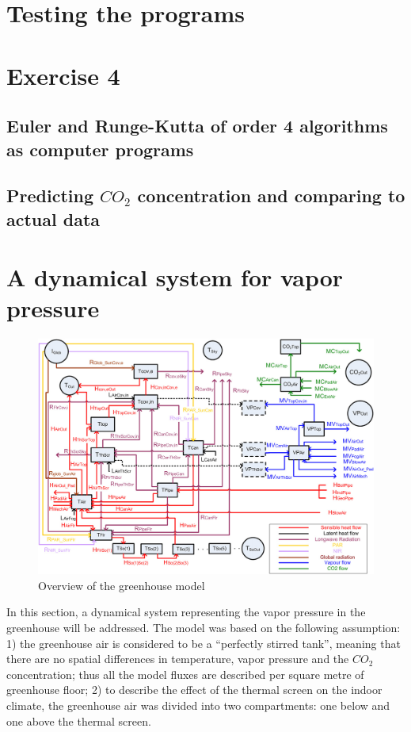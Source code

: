 \documentclass[a4paper]{article}
\begin{document}
\newpage
\section{Testing the programs}


\newpage
\section{Exercise 4}
\subsection{Euler and Runge-Kutta of order 4 algorithms as computer programs}

\subsection{Predicting \(CO_2\) concentration and comparing to actual data}


\newpage
\section{A dynamical system for vapor pressure}

\begin{figure}[H]
  \centering
  \includegraphics[width=\textwidth]{overview}
  \caption{Overview of the greenhouse model}\label{fig:overview}
\end{figure}

In this section, a dynamical system representing the vapor pressure in the greenhouse will be addressed.
The model was based on the following assumption:
1) the greenhouse air is considered to be a ``perfectly stirred tank'', meaning that there are no spatial differences in temperature, vapor pressure and the \(CO_2\) concentration; thus all the model fluxes are described per square metre of greenhouse floor;
2) to describe the effect of the thermal screen on the indoor climate, the greenhouse air was divided into two compartments: one below and one above the thermal screen.
\end{document}
